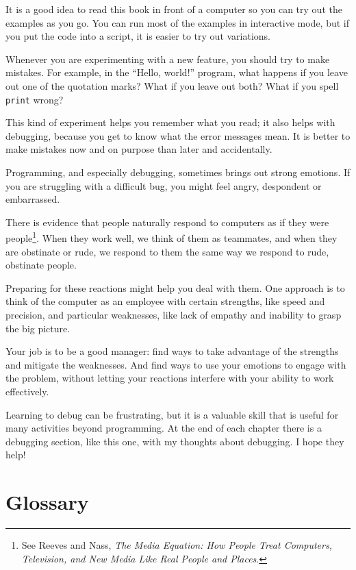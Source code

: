 \documentclass[10pt]{book}
\begin{document}
It is a good idea to read this book in front of a computer so you can
try out the examples as you go.  You can run most of the examples in
interactive mode, but if you put the code into a script, it is easier
to try out variations.

Whenever you are experimenting with a new feature, you should try
to make mistakes.  For example, in the ``Hello, world!'' program,
what happens if you leave out one of the quotation marks?  What
if you leave out both?  What if you spell {\tt print} wrong?


This kind of experiment helps you remember what you read; it also helps
with debugging, because you get to know what the error messages mean.
It is better to make mistakes now and on purpose than later
and accidentally.

Programming, and especially debugging, sometimes brings out strong
emotions.  If you are struggling with a difficult bug, you might 
feel angry, despondent or embarrassed.

There is evidence that people naturally respond to computers as if
they were people\footnote{See Reeves and Nass, {\it The Media
    Equation: How People Treat Computers, Television, and New Media
    Like Real People and Places}.}.  When they work well, we think
of them as teammates, and when they are obstinate or rude, we
respond to them the same way we respond to rude,
obstinate people.


Preparing for these reactions might help you deal with them.
One approach is to think of the computer as an employee with
certain strengths, like speed and precision, and
particular weaknesses, like lack of empathy and inability
to grasp the big picture.

Your job is to be a good manager: find ways to take advantage
of the strengths and mitigate the weaknesses.  And find ways
to use your emotions to engage with the problem,
without letting your reactions interfere with your ability
to work effectively.

Learning to debug can be frustrating, but it is a valuable skill
that is useful for many activities beyond programming.  At the
end of each chapter there is a debugging section, like this one,
with my thoughts about debugging.  I hope they help!


\section{Glossary}
\end{document}
